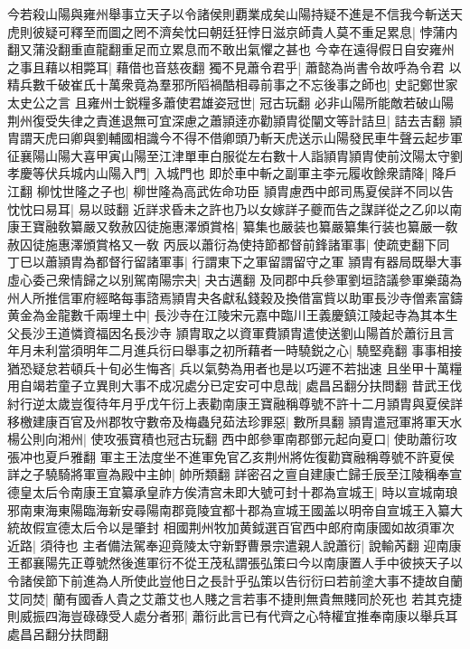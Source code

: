 今若殺山陽與雍州舉事立天子以令諸侯則覇業成矣山陽持疑不進是不信我今斬送天虎則彼疑可釋至而圖之罔不濟矣忱曰朝廷狂悖日滋京師貴人莫不重足累息|{
	悖蒲内翻又蒲没翻重直龍翻重足而立累息而不敢出氣懼之甚也}
今幸在遠得假日自安雍州之事且藉以相斃耳|{
	藉借也音慈夜翻}
獨不見蕭令君乎|{
	蕭懿為尚書令故呼為令君}
以精兵數千破崔氏十萬衆竟為羣邪所䧟禍酷相尋前事之不忘後事之師也|{
	史記鄭世家太史公之言}
且雍州士鋭糧多蕭使君雄姿冠世|{
	冠古玩翻}
必非山陽所能敵若破山陽荆州復受失律之責進退無可宜深慮之蕭頴逹亦勸頴胄從闡文等計詰旦|{
	詰去吉翻}
頴胄謂天虎曰卿與劉輔國相識今不得不借卿頭乃斬天虎送示山陽發民車牛聲云起步軍征襄陽山陽大喜甲寅山陽至江津單車白服從左右數十人詣頴胄頴胄使前汶陽太守劉孝慶等伏兵城内山陽入門|{
	入城門也}
即於車中斬之副軍主李元履收餘衆請降|{
	降戶江翻}
柳忱世隆之子也|{
	柳世隆為高武佐命功臣}
頴胄慮西中郎司馬夏侯詳不同以告忱忱曰易耳|{
	易以豉翻}
近詳求昏未之許也乃以女嫁詳子夔而告之謀詳從之乙卯以南康王寶融敎纂嚴又敎赦囚徒施惠澤頒賞格|{
	纂集也嚴装也纂嚴纂集行装也纂嚴一敎赦囚徒施惠澤頒賞格又一敎}
丙辰以蕭衍為使持節都督前鋒諸軍事|{
	使疏吏翻下同}
丁巳以蕭頴胄為都督行留諸軍事|{
	行謂東下之軍留謂留守之軍}
頴胄有器局既舉大事虛心委己衆情歸之以别駕南陽宗夬|{
	夬古邁翻}
及同郡中兵參軍劉垣諮議參軍樂藹為州人所推信軍府經略每事諮焉頴胄夬各獻私錢穀及換借富貲以助軍長沙寺僧素富鑄黄金為金龍數千兩埋土中|{
	長沙寺在江陵宋元嘉中臨川王義慶鎮江陵起寺為其本生父長沙王道憐資福因名長沙寺}
頴胄取之以資軍費頴胄遣使送劉山陽首於蕭衍且言年月未利當須明年二月進兵衍曰舉事之初所藉者一時驍鋭之心|{
	驍堅堯翻}
事事相接猶恐疑怠若頓兵十旬必生悔吝|{
	兵以氣勢為用者也是以巧遲不若拙速}
且坐甲十萬糧用自竭若童子立異則大事不成况處分已定安可中息哉|{
	處昌呂翻分扶問翻}
昔武王伐紂行逆太歲豈復待年月乎戊午衍上表勸南康王寶融稱尊號不許十二月頴胄與夏侯詳移檄建康百官及州郡牧守數帝及梅蟲兒茹法珍罪惡|{
	數所具翻}
頴胄遣冠軍將軍天水楊公則向湘州|{
	使攻張寶積也冠古玩翻}
西中郎參軍南郡鄧元起向夏口|{
	使助蕭衍攻張冲也夏戶雅翻}
軍主王法度坐不進軍免官乙亥荆州將佐復勸寶融稱尊號不許夏侯詳之子驍騎將軍亶為殿中主帥|{
	帥所類翻}
詳密召之亶自建康亡歸壬辰至江陵稱奉宣德皇太后令南康王宜纂承皇祚方俟清宫未即大號可封十郡為宣城王|{
	時以宣城南琅邪南東海東陽臨海新安尋陽南郡竟陵宜都十郡為宣城王國盖以明帝自宣城王入纂大統故假宣德太后令以是肇封}
相國荆州牧加黄鉞選百官西中郎府南康國如故須軍次近路|{
	須待也}
主者備法駕奉迎竟陵太守新野曹景宗遣親人說蕭衍|{
	說輸芮翻}
迎南康王都襄陽先正尊號然後進軍衍不從王茂私謂張弘策曰今以南康置人手中彼挾天子以令諸侯節下前進為人所使此豈他日之長計乎弘策以告衍衍曰若前塗大事不捷故自蘭艾同焚|{
	蘭有國香人貴之艾蕭艾也人賤之言若事不捷則無貴無賤同於死也}
若其克捷則威振四海豈碌碌受人處分者邪|{
	蕭衍此言已有代齊之心特權宜推奉南康以舉兵耳處昌呂翻分扶問翻}

